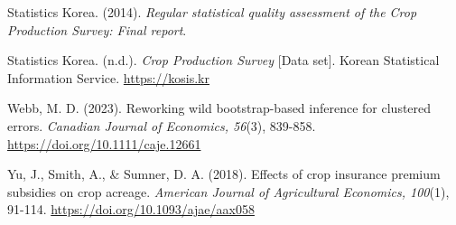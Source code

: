 \begin{thebibliography}{}
Statistics Korea. (2014). \textit{Regular statistical quality assessment of the Crop Production Survey: Final report}.

Statistics Korea. (n.d.). \textit{Crop Production Survey} [Data set]. Korean Statistical Information Service. \url{https://kosis.kr}

Webb, M. D. (2023). Reworking wild bootstrap-based inference for clustered errors. \textit{Canadian Journal of Economics, 56}(3), 839-858. \url{https://doi.org/10.1111/caje.12661}

Yu, J., Smith, A., \& Sumner, D. A. (2018). Effects of crop insurance premium subsidies on crop acreage. \textit{American Journal of Agricultural Economics, 100}(1), 91-114. \url{https://doi.org/10.1093/ajae/aax058}

\end{thebibliography}
\endgroup
